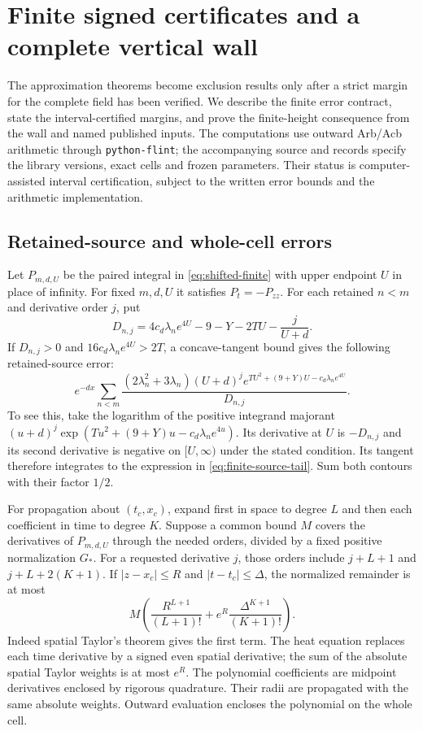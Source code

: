 \section{Finite signed certificates and a complete vertical wall}
\label{sec:finite}

The approximation theorems become exclusion results only after a strict
margin for the complete field has been verified. We describe the finite
error contract, state the interval-certified margins, and prove the
finite-height consequence from the wall and named published inputs.
The computations use outward Arb/Acb arithmetic through
\texttt{python-flint}; the accompanying source and records specify the
library versions, exact cells and frozen parameters. Their status is
computer-assisted interval certification, subject to the written error
bounds and the arithmetic implementation.

\subsection{Retained-source and whole-cell errors}

Let $P_{m,d,U}$ be the paired integral in
\eqref{eq:shifted-finite} with upper endpoint $U$ in place of infinity.
For fixed $m,d,U$ it satisfies $P_t=-P_{zz}$. For each retained
$n<m$ and derivative order $j$, put
\[
 D_{n,j}=4c_d\lambda_ne^{4U}-9-Y-2TU-\frac j{U+d}.
\]
If $D_{n,j}>0$ and $16c_d\lambda_ne^{4U}>2T$, a concave-tangent
bound gives the following retained-source error:
\begin{equation}\label{eq:finite-source-tail}
 e^{-dx}\sum_{n<m}
 \frac{(2\lambda_n^2+3\lambda_n)(U+d)^j
 e^{TU^2+(9+Y)U-c_d\lambda_ne^{4U}}}{D_{n,j}}.
\end{equation}
To see this, take the logarithm of the positive integrand majorant
$(u+d)^j\exp(Tu^2+(9+Y)u-c_d\lambda_ne^{4u})$.
Its derivative at $U$ is $-D_{n,j}$ and its second derivative
is negative on $[U,\infty)$ under the stated condition.
Its tangent therefore integrates to the expression in
\eqref{eq:finite-source-tail}. Sum both contours with their factor $1/2$.

For propagation about $(t_c,x_c)$, expand first in space to degree $L$
and then each coefficient in time to degree $K$. Suppose a common bound
$M$ covers the derivatives of $P_{m,d,U}$ through the needed orders,
divided by a fixed positive normalization $G_*$. For a requested
derivative $j$, those orders include
$j+L+1$ and $j+L+2(K+1)$. If
$|z-x_c|\le R$ and $|t-t_c|\le\Delta$, the normalized remainder is at most
\begin{equation}\label{eq:cell-taylor}
 M\left(\frac{R^{L+1}}{(L+1)!}
       +e^R\frac{\Delta^{K+1}}{(K+1)!}\right).
\end{equation}
Indeed spatial Taylor's theorem gives the first term. The heat equation
replaces each time derivative by a signed even spatial derivative; the
sum of the absolute spatial Taylor weights is at most $e^R$.
The polynomial coefficients are midpoint derivatives enclosed by rigorous
quadrature. Their radii are propagated with the same absolute weights.
Outward evaluation encloses the polynomial on the whole cell.

